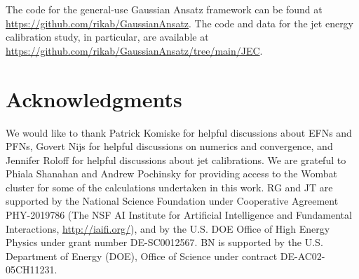 \documentclass[prl,twocolumn,superscriptaddress,longbibliography,preprintnumbers,floatfix,nofootinbib]{revtex4-1}
\newcommand{\GaussianAnsatz}{{Gaussian Ansatz}\xspace}
\begin{document}
The code for the general-use \GaussianAnsatz framework can be found at \url{https://github.com/rikab/GaussianAnsatz}.
%
The code and data for the jet energy calibration study, in particular, are available at \url{https://github.com/rikab/GaussianAnsatz/tree/main/JEC}.

\section*{Acknowledgments}

We would like to thank Patrick Komiske for helpful discussions about EFNs and PFNs, Govert Nijs for helpful discussions on numerics and convergence, and Jennifer Roloff for helpful discussions about jet calibrations.
%
We are grateful to Phiala Shanahan and Andrew Pochinsky for providing access to the Wombat cluster for some of the calculations undertaken in this work.
%
RG and JT are supported by the National Science Foundation under Cooperative Agreement PHY-2019786 (The NSF AI Institute for Artificial Intelligence and Fundamental Interactions, \url{http://iaifi.org/}), and by the U.S. DOE Office of High Energy Physics under grant number DE-SC0012567.
%
BN is supported by the U.S. Department of Energy (DOE), Office of Science under contract DE-AC02-05CH11231.
\textbf{}

\end{document}
